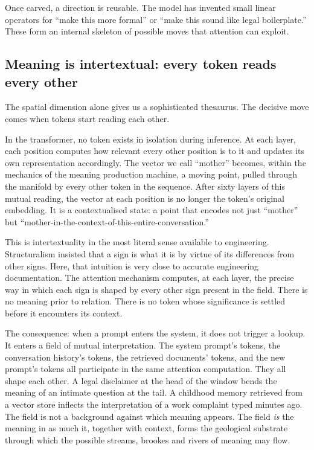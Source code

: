Once carved, a direction is reusable. The model has invented small linear operators for ``make this more formal'' or ``make this sound like legal boilerplate.'' These form an internal skeleton of possible moves that attention can exploit.

\subsection{Meaning is intertextual: every token reads every other}

The spatial dimension alone gives us a sophisticated thesaurus. The decisive move comes when tokens start reading each other.

In the transformer, no token exists in isolation during inference. At each layer, each position computes how relevant every other position is to it and updates its own representation accordingly. The vector we call ``mother'' becomes, within the mechanics of the meaning production machine, a moving point, pulled through the manifold by every other token in the sequence. After sixty layers of this mutual reading, the vector at each position is no longer the token's original embedding. It is a contextualised state: a point that encodes not just ``mother'' but ``mother-in-the-context-of-this-entire-conversation.''

This is intertextuality in the most literal sense available to engineering. Structuralism insisted that a sign is what it is by virtue of its differences from other signs. Here, that intuition is very close to accurate engineering documentation. The attention mechanism computes, at each layer, the precise way in which each sign is shaped by every other sign present in the field. There is no meaning prior to relation. There is no token whose significance is settled before it encounters its context.

The consequence: when a prompt enters the system, it does not trigger a lookup. It enters a field of mutual interpretation. The system prompt's tokens, the conversation history's tokens, the retrieved documents' tokens, and the new prompt's tokens all participate in the same attention computation. They all shape each other. A legal disclaimer at the head of the window bends the meaning of an intimate question at the tail. A childhood memory retrieved from a vector store inflects the interpretation of a work complaint typed minutes ago. The field is not a background against which meaning appears. The field \emph{is} the meaning in as much it, together with context, forms the geological substrate through which the possible streams, brookes and rivers of meaning may flow.

